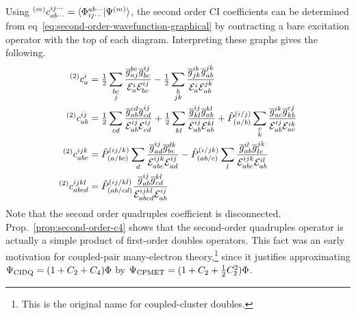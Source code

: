 \documentclass[11pt]{article}
\numberwithin{equation}{section}
\begin{document}
\begin{ex}
Using
${}^{(m)}c_{ab\cdots}^{ij\cdots}=\langle\Phi _{ij\cdots}^{ab\cdots}|\Psi ^{(m)}\rangle$, the second order CI coefficients can be determined from eq~\ref{eq:second-order-wavefunction-graphical} by contracting a bare excitation operator with the top of each diagram.
Interpreting these graphs gives the following.
\begin{align*}
  {}^{(2)}c_a^i
&=
  \tfrac{1}{2}
  \sum_{\substack{bc\\j}}
  \frac {
    \overline{g}_{aj}^{bc}
    \overline{g}_{bc}^{ij}
  }{
    \mathcal{E}_a^i
    \mathcal{E}_{bc}^{ij}
  }
-
  \tfrac{1}{2}
  \sum_{\substack{b\\jk}}
  \frac {
    \overline{g}_{jk}^{ib}
    \overline{g}_{ab}^{jk}
  }{
    \mathcal{E}_a^i
    \mathcal{E}_{ab}^{jk}
  }
\\
  {}^{(2)}c_{ab}^{ij}
&=
  \tfrac{1}{2}
  \sum_{\substack{cd}}
  \frac {
    \overline{g}_{ab}^{cd}
    \overline{g}_{cd}^{ij}
  }{
    \mathcal{E}_{ab}^{ij}
    \mathcal{E}_{cd}^{ij}
  }
+
  \tfrac{1}{2}
  \sum_{\substack{kl}}
  \frac {
    \overline{g}_{kl}^{ij}
    \overline{g}_{ab}^{kl}
  }{
    \mathcal{E}_{ab}^{ij}
    \mathcal{E}_{ab}^{kl}
  }
+
  \hat{P}_{(a/b)}^{(i/j)}
  \sum_{\substack{c\\k}}
  \frac {
    \overline{g}_{ac}^{ik}
    \overline{g}_{kb}^{cj}
  }{
    \mathcal{E}_{ab}^{ij}
    \mathcal{E}_{ac}^{ik}
  }
\\
  {}^{(2)}c_{abc}^{ijk}
&=
  \hat{P}_{(a/bc)}^{(ij/k)}
  \sum_{\substack{d}}
  \frac {
    \overline{g}_{ad}^{ij}
    \overline{g}_{bc}^{dk}
  }{
    \mathcal{E}_{abc}^{ijk}
    \mathcal{E}_{ad}^{ij}
  }
-
  \hat{P}_{(ab/c)}^{(i/jk)}
  \sum_{\substack{l}}
  \frac {
    \overline{g}_{ab}^{il}
    \overline{g}_{lc}^{jk}
  }{
    \mathcal{E}_{abc}^{ijk}
    \mathcal{E}_{ab}^{il}
  }
\\
  {}^{(2)}c_{abcd}^{ijkl}
&=
  \hat{P}_{(ab/cd)}^{(ij/kl)}
  \frac {
    \overline{g}_{ab}^{ij}
    \overline{g}_{cd}^{kl}
  }{
    \mathcal{E}_{abcd}^{ijkl}
    \mathcal{E}_{ab}^{ij}
  }
\end{align*}
Note that the second order quadruples coefficient is disconnected.
Prop.~\ref{prop:second-order-c4} shows that the second-order quadruples operator is actually a simple product of first-order doubles operators.
This fact was an early motivation for coupled-pair many-electron theory,\footnote{This is the original name for coupled-cluster doubles.} since it justifies approximating
$
  \Psi _{\mathrm{CIDQ}}
=
  (1+C_2+C_4)\Phi 
$
by
$
  \Psi _{\mathrm{CPMET}}
=
  (1 + C_2 + \tfrac{1}{2}C_2^2)\Phi 
$.
\end{ex}
\end{document}
